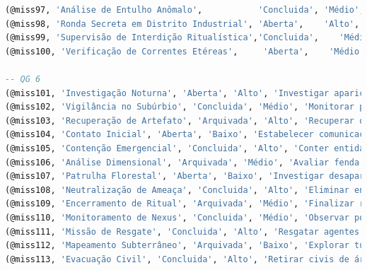 \documentclass[12pt,a4paper]{report}
\begin{document}
\begin{lstlisting}[language=SQL, caption=population.sql]
(@miss97, 'Análise de Entulho Anômalo',           'Concluida', 'Médio',  'Catalogar resíduos mágicos',            '2025-04-01 03:00:00', '2025-04-22', @addr95, @hq5),
(@miss98, 'Ronda Secreta em Distrito Industrial', 'Aberta',    'Alto',   'Identificar entidades encobertas',      '2025-05-30 22:00:00', NULL,         @addr96, @hq5),
(@miss99, 'Supervisão de Interdição Ritualística','Concluida',    'Médio',  'Manter área protegida',                 '2025-02-02 04:30:00', '2025-02-24',         @addr97, @hq5),
(@miss100, 'Verificação de Correntes Etéreas',     'Aberta',    'Médio',  'Examinar presença de vórtices sutis',   '2025-06-03 03:00:00', NULL,         @addr99, @hq5),

-- QG 6
(@miss101, 'Investigação Noturna', 'Aberta', 'Alto', 'Investigar aparições em armazém abandonado', '2025-04-01', NULL,              @addr5, @hq6),
(@miss102, 'Vigilância no Subúrbio', 'Concluida', 'Médio', 'Monitorar padrões de energia incomuns', '2025-03-15', '2025-03-20',     @addr8, @hq6),
(@miss103, 'Recuperação de Artefato', 'Arquivada', 'Alto', 'Recuperar objeto de origem paranormal', '2024-11-10', '2024-11-15',     @addr12, @hq6),
(@miss104, 'Contato Inicial', 'Aberta', 'Baixo', 'Estabelecer comunicação com entidade pacífica', '2025-05-10', NULL,               @addr9, @hq6),
(@miss105, 'Contenção Emergencial', 'Concluida', 'Alto', 'Conter entidade manifestada em hospital', '2025-02-01', '2025-02-23',     @addr4, @hq6),
(@miss106, 'Análise Dimensional', 'Arquivada', 'Médio', 'Avaliar fenda dimensional ativa', '2024-10-12', '2024-10-20',              @addr7, @hq6),
(@miss107, 'Patrulha Florestal', 'Aberta', 'Baixo', 'Investigar desaparecimentos recorrentes', '2025-05-01', NULL,                  @addr11, @hq6),
(@miss108, 'Neutralização de Ameaça', 'Concluida', 'Alto', 'Eliminar entidade hostil em zona rural', '2025-01-25', '2025-01-30',    @addr6, @hq6),
(@miss109, 'Encerramento de Ritual', 'Arquivada', 'Médio', 'Finalizar ritual incompleto com segurança', '2024-09-05', '2024-09-10', @addr14, @hq6),
(@miss110, 'Monitoramento de Nexus', 'Concluida', 'Médio', 'Observar ponto de energia instável', '2025-04-15', '2025-05-14',                   @addr10, @hq6),
(@miss111, 'Missão de Resgate', 'Concluida', 'Alto', 'Resgatar agentes desaparecidos em missão anterior', '2025-03-25','2025-04-07',@addr3, @hq6),
(@miss112, 'Mapeamento Subterrâneo', 'Arquivada', 'Baixo', 'Explorar túneis descobertos por radar', '2024-08-01', '2024-08-12',     @addr13, @hq6),
(@miss113, 'Evacuação Civil', 'Concluida', 'Alto', 'Retirar civis de área com atividade paranormal', '2025-04-12', '2025-05-14',               @addr15, @hq6),

\end{lstlisting}
\end{document}
